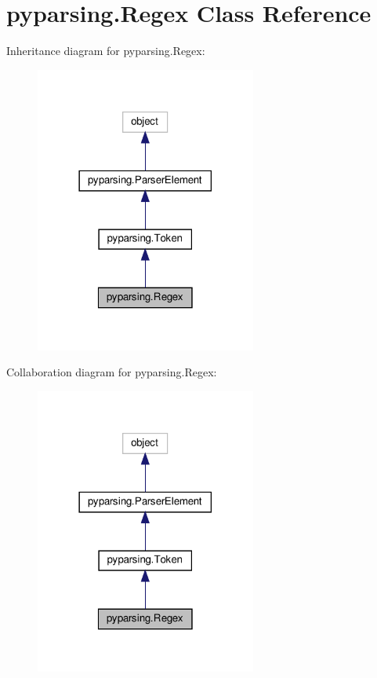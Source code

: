 \hypertarget{classpyparsing_1_1Regex}{}\section{pyparsing.\+Regex Class Reference}
\label{classpyparsing_1_1Regex}


Inheritance diagram for pyparsing.\+Regex\+:
\nopagebreak
\begin{figure}[H]
\begin{center}
\leavevmode
\includegraphics[width=206pt]{classpyparsing_1_1Regex__inherit__graph}
\end{center}
\end{figure}


Collaboration diagram for pyparsing.\+Regex\+:
\nopagebreak
\begin{figure}[H]
\begin{center}
\leavevmode
\includegraphics[width=206pt]{classpyparsing_1_1Regex__coll__graph}
\end{center}
\end{figure}
